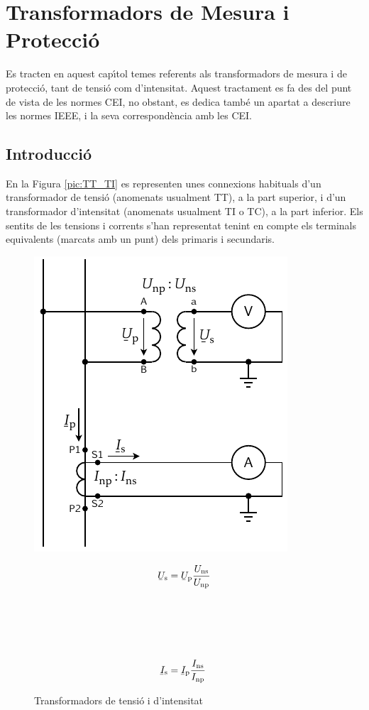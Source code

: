 \chapter{Transformadors de Mesura i Protecci\'{o}}\label{sec:tr_mes_prot}

Es tracten en aquest cap\'{\i}tol temes referents als transformadors de
mesura i de protecci\'{o}, tant de tensi\'{o} com d'intensitat. Aquest
tractament es fa des del punt de vista de les normes \textsf{CEI}, no obstant, es dedica tamb\'{e} un
apartat a descriure les normes \textsf{IEEE}, i la seva
correspond\`{e}ncia amb les \textsf{\textsf{CEI}}.

\section{Introducci\'{o}}

En la Figura \vref{pic:TT_TI} es representen unes connexions
habituals d'un transformador de tensi\'{o} (anomenats usualment TT), a
la part superior, i d'un transformador d'intensitat (anomenats
usualment TI o TC), a la part inferior. Els sentits de les tensions
i corrents s'han representat tenint en compte els terminals
equivalents (marcats amb un punt) dels primaris i secundaris.

\begin{figure}[h!]
\hfill
\begin{minipage}[b]{90mm}
\hspace{1.5cm}
    \includegraphics{Imatges/Cap-TrafosMesProt-TI-TT.pdf}
\caption{Transformadors de tensi\'{o} i d'intensitat} \label{pic:TT_TI}
\end{minipage}
\hfill
\begin{minipage}[b][70mm][t]{50mm}
   \begin{align}
      \cmplx{U}\ped{s} &= \cmplx{U}\ped{p} \frac{U\ped{ns}}{U\ped{np}}
      \\[24mm]
      \cmplx{I}\ped{s} &= \cmplx{I}\ped{p} \frac{I\ped{ns}}{I\ped{np}}
   \end{align}
\end{minipage}
\end{figure}

